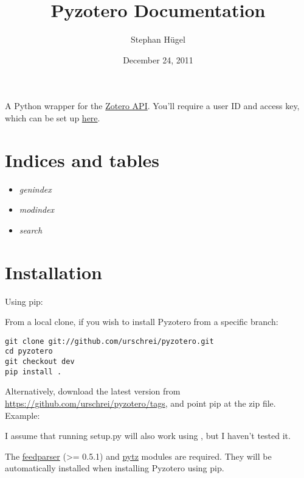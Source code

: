 \documentclass[letterpaper,10pt,english]{sphinxmanual}
\title{Pyzotero Documentation}
\date{December 24, 2011}
\author{Stephan Hügel}
\begin{document}
\maketitle
\tableofcontents
{}\label{index::doc}


A Python wrapper for the \href{http://www.zotero.org/support/dev/server\_api}{Zotero API}. You'll require a user ID and access key, which can be set up \href{http://www.zotero.org/settings/keys/new}{here}.
\label{index:module-pyzotero.zotero}

\chapter{Indices and tables}
\label{index:indices-and-tables}\label{index:description}\begin{itemize}
\item {} 
\emph{genindex}

\item {} 
\emph{modindex}

\item {} 
\emph{search}

\end{itemize}


\chapter{Installation}
\label{index:installation}
Using pip: 

From a local clone, if you wish to install Pyzotero from a specific branch:

\begin{Verbatim}[commandchars=\\\{\}]
git clone git://github.com/urschrei/pyzotero.git
cd pyzotero
git checkout dev
pip install .
\end{Verbatim}

Alternatively, download the latest version from \href{https://github.com/urschrei/pyzotero/tags}{https://github.com/urschrei/pyzotero/tags}, and point pip at the zip file.
Example: 

I assume that running setup.py will also work using , but I haven't tested it.

The \href{http://feedparser.org}{feedparser} (\textgreater{}= 0.5.1) and \href{http://pypi.python.org/pypi/pytz/}{pytz} modules are required. They will be automatically installed when installing Pyzotero using pip.
\end{document}
